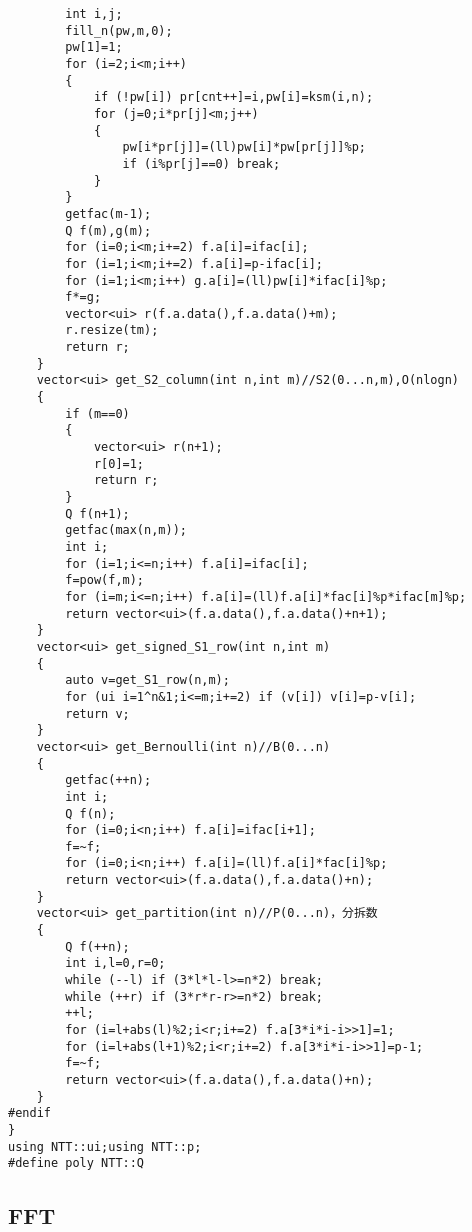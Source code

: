 \documentclass[12pt]{ctexart}
\begin{document}
\begin{lstlisting}
		int i,j;
		fill_n(pw,m,0);
		pw[1]=1;
		for (i=2;i<m;i++)
		{
			if (!pw[i]) pr[cnt++]=i,pw[i]=ksm(i,n);
			for (j=0;i*pr[j]<m;j++)
			{
				pw[i*pr[j]]=(ll)pw[i]*pw[pr[j]]%p;
				if (i%pr[j]==0) break;
			}
		}
		getfac(m-1);
		Q f(m),g(m);
		for (i=0;i<m;i+=2) f.a[i]=ifac[i];
		for (i=1;i<m;i+=2) f.a[i]=p-ifac[i];
		for (i=1;i<m;i++) g.a[i]=(ll)pw[i]*ifac[i]%p;
		f*=g;
		vector<ui> r(f.a.data(),f.a.data()+m);
		r.resize(tm);
		return r;
	}
	vector<ui> get_S2_column(int n,int m)//S2(0...n,m),O(nlogn)
	{
		if (m==0)
		{
			vector<ui> r(n+1);
			r[0]=1;
			return r;
		}
		Q f(n+1);
		getfac(max(n,m));
		int i;
		for (i=1;i<=n;i++) f.a[i]=ifac[i];
		f=pow(f,m);
		for (i=m;i<=n;i++) f.a[i]=(ll)f.a[i]*fac[i]%p*ifac[m]%p;
		return vector<ui>(f.a.data(),f.a.data()+n+1);
	}
	vector<ui> get_signed_S1_row(int n,int m)
	{
		auto v=get_S1_row(n,m);
		for (ui i=1^n&1;i<=m;i+=2) if (v[i]) v[i]=p-v[i];
		return v;
	}
	vector<ui> get_Bernoulli(int n)//B(0...n)
	{
		getfac(++n);
		int i;
		Q f(n);
		for (i=0;i<n;i++) f.a[i]=ifac[i+1];
		f=~f;
		for (i=0;i<n;i++) f.a[i]=(ll)f.a[i]*fac[i]%p;
		return vector<ui>(f.a.data(),f.a.data()+n);
	}
	vector<ui> get_partition(int n)//P(0...n)，分拆数
	{
		Q f(++n);
		int i,l=0,r=0;
		while (--l) if (3*l*l-l>=n*2) break;
		while (++r) if (3*r*r-r>=n*2) break;
		++l;
		for (i=l+abs(l)%2;i<r;i+=2) f.a[3*i*i-i>>1]=1;
		for (i=l+abs(l+1)%2;i<r;i+=2) f.a[3*i*i-i>>1]=p-1;
		f=~f;
		return vector<ui>(f.a.data(),f.a.data()+n);
	}
#endif
}
using NTT::ui;using NTT::p;
#define poly NTT::Q
\end{lstlisting}

\subsection{FFT}
\end{document}
